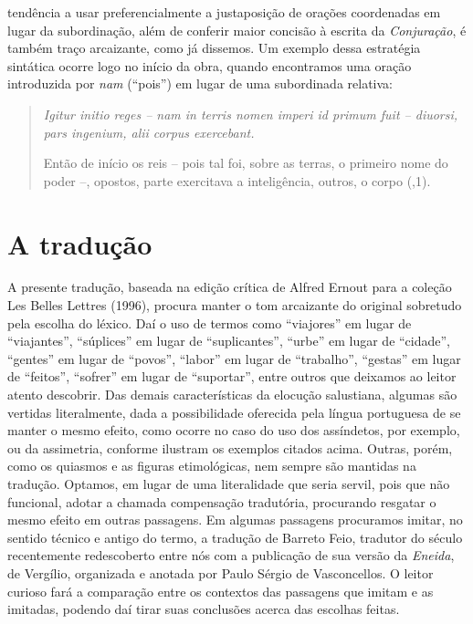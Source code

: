 tendência a usar preferencialmente a justaposição de orações coordenadas em
lugar da subordinação, além de conferir maior concisão à escrita da \emph{Conjuração},
é também traço arcaizante, como já dissemos. Um exemplo dessa estratégia
sintática ocorre logo no início da obra, quando encontramos uma oração
introduzida por \emph{nam} (“pois”) em lugar de uma subordinada relativa:
\begin{quote} \emph{Igitur initio reges – nam in terris nomen imperi id primum
  fuit – diuorsi, pars ingenium, alii corpus exercebant.}

Então de início os reis – pois tal foi, sobre as terras, o primeiro nome do
poder –, opostos, parte exercitava a inteligência, outros, o corpo (,1).
\end{quote}

\section{A tradução}

 A presente tradução, baseada na edição crítica de Alfred Ernout para a coleção
 Les Belles Lettres (1996), procura manter o tom arcaizante do original
 sobretudo pela escolha do léxico. Daí o uso de termos como “viajores” em lugar
 de “viajantes”, “súplices” em lugar de “suplicantes”, “urbe” em lugar de
 “cidade”, “gentes” em lugar de “povos”, “labor” em lugar de “trabalho”,
 “gestas” em lugar de “feitos”, “sofrer” em lugar de “suportar”, entre outros
 que deixamos ao leitor atento descobrir.  Das demais características da
 elocução salustiana, algumas são vertidas literalmente, dada a possibilidade
 oferecida pela língua portuguesa de se manter o mesmo efeito, como ocorre no
 caso do uso dos assíndetos, por exemplo, ou da assimetria, conforme ilustram
 os exemplos citados acima. Outras, porém, como os quiasmos e as figuras
 etimológicas, nem sempre são mantidas na tradução. Optamos, em lugar de uma
 literalidade que seria servil, pois que não funcional, adotar a chamada
 compensação tradutória, procurando resgatar o mesmo efeito em outras
 passagens.  Em algumas passagens procuramos imitar, no sentido técnico
 e antigo do termo, a tradução de Barreto Feio, tradutor do século 
 recentemente redescoberto entre nós com a publicação de sua versão da \emph{Eneida},
 de Vergílio, organizada e anotada por Paulo Sérgio de Vasconcellos. O leitor
 curioso fará a comparação entre os contextos das passagens que imitam e as
 imitadas, podendo daí tirar suas conclusões acerca das escolhas feitas. 

